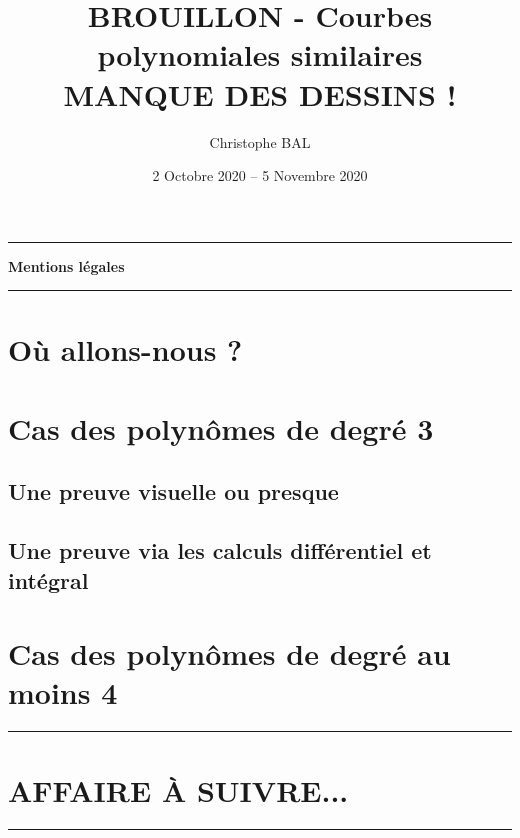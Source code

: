\documentclass[12pt]{amsart}
\begin{document}
\title{BROUILLON - Courbes polynomiales similaires \\ MANQUE DES DESSINS !}
\author{Christophe BAL}
\date{2 Octobre 2020 -- 5 Novembre 2020}
\maketitle


\begin{center}
	\hrule\vspace{.3em}
	{
		\fontsize{1.35em}{1em}\selectfont
		\textbf{Mentions \og légales \fg}
	}
			
	\vspace{0.45em}
	\doclicenseThis
	\hrule
\end{center}



\setcounter{tocdepth}{2}
\tableofcontents




\newpage
\section{Où allons-nous ?}






\section{Cas des polynômes de degré 3} 

\subsection{Une preuve visuelle ou presque}




\subsection{Une preuve via les calculs différentiel et intégral}






\section{Cas des polynômes de degré au moins 4} 



\bigskip

\hrule

\section{AFFAIRE À SUIVRE...}

\bigskip

\hrule
\end{document}
